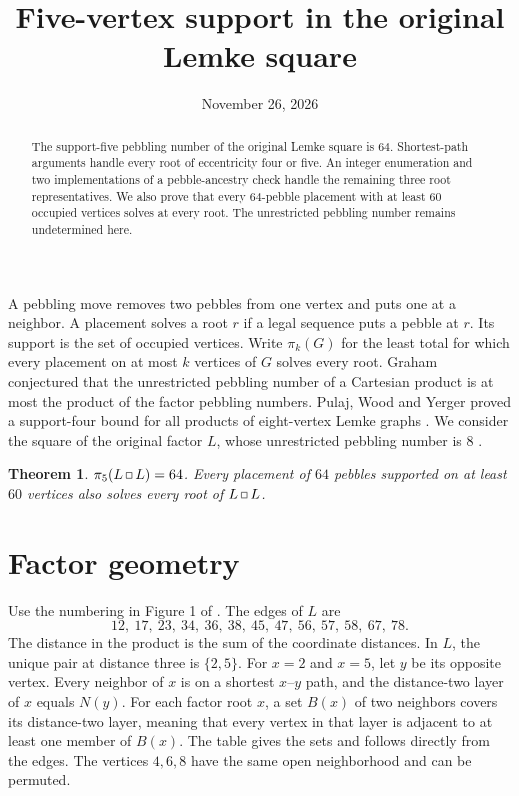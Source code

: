 \documentclass[10pt]{article}
\title{Five-vertex support in the original Lemke square}
\author{}
\date{November 26, 2026}
\newtheorem{theorem}{Theorem}
\newcommand{\sq}{\mathbin{\vcenter{\hbox{\setlength{\fboxsep}{0.6pt}%
  \fbox{\rule{0pt}{2.4pt}\rule{2.4pt}{0pt}}}}}}
\begin{document}
\maketitle

\begin{abstract}
The support-five pebbling number of the original Lemke square is $64$.
Shortest-path arguments handle every root of eccentricity four or five.
An integer enumeration and two implementations of a pebble-ancestry check
handle the remaining three root representatives. We also prove that every
$64$-pebble placement with at least $60$ occupied vertices solves at every
root. The unrestricted pebbling number remains undetermined here.
\end{abstract}

A pebbling move removes two pebbles from one vertex and puts one at a
neighbor. A placement solves a root $r$ if a legal sequence puts a pebble at
$r$. Its support is the set of occupied vertices. Write $\pi_k(G)$ for the
least total for which every placement on at most $k$ vertices of $G$ solves
every root. Graham conjectured that the unrestricted pebbling number of a
Cartesian product is at most the product of the factor pebbling numbers.
Pulaj, Wood and Yerger proved a support-four bound for all products of
eight-vertex Lemke graphs \cite{pulaj}. We consider the square of the
original factor $L$, whose unrestricted pebbling number is $8$
\cite[proof of Theorem~1]{pulaj}.

\begin{theorem}
$\pi_5(L\sq L)=64$. Every placement of $64$ pebbles supported on at
least $60$ vertices also solves every root of $L\sq L$.
\end{theorem}

\section{Factor geometry}

Use the numbering in Figure 1 of \cite{pulaj}. The edges of $L$ are
\[
12,\ 17,\ 23,\ 34,\ 36,\ 38,\ 45,\ 47,\ 56,\ 57,\ 58,\ 67,\ 78.
\]
The distance in the product is the sum of the coordinate distances.
In $L$, the unique pair at distance three is $\{2,5\}$.
For $x=2$ and $x=5$, let $y$ be its opposite vertex. Every neighbor
of $x$ is on a shortest $x$--$y$ path, and the distance-two layer of $x$
equals $N(y)$. For each factor root $x$, a set $B(x)$ of two neighbors
covers its distance-two layer, meaning that every vertex in that
layer is adjacent to at least one member of $B(x)$.
The table gives the sets and follows directly from the edges.
The vertices $4,6,8$ have the same open neighborhood and can be permuted.
\end{document}
